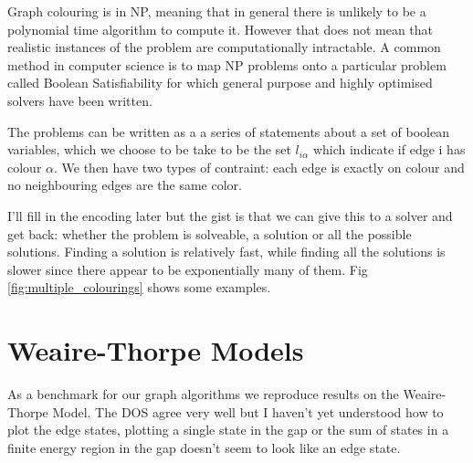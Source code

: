 Graph colouring is in NP, meaning that in general there is unlikely to be a polynomial time algorithm to compute it. However that does not mean that realistic instances of the problem are computationally intractable. A common method in computer science is to map NP problems onto a particular problem called Boolean Satisfiability for which general purpose and highly optimised solvers have been written.

The problems can be written as a a series of statements about a set of boolean variables, which we choose to be take to be the set \(l_{i\alpha}\) which indicate if edge i has colour \(\alpha\). We then have two types of contraint: each edge is exactly on colour and no neighbouring edges are the same color. 

I'll fill in the encoding later but the gist is that we can give this to a solver and get back: whether the problem is solveable, a solution or all the possible solutions. Finding a solution is relatively fast, while finding all the solutions is slower since there appear to be exponentially many of them. Fig \ref{fig:multiple_colourings} shows some examples. 




\section{Weaire-Thorpe Models}
As a benchmark for our graph algorithms we reproduce results on the Weaire-Thorpe Model. The DOS agree very well but I haven't yet understood how to plot the edge states, plotting a single state in the gap or the sum of states in a finite energy region in the gap doesn't seem to look like an edge state.




